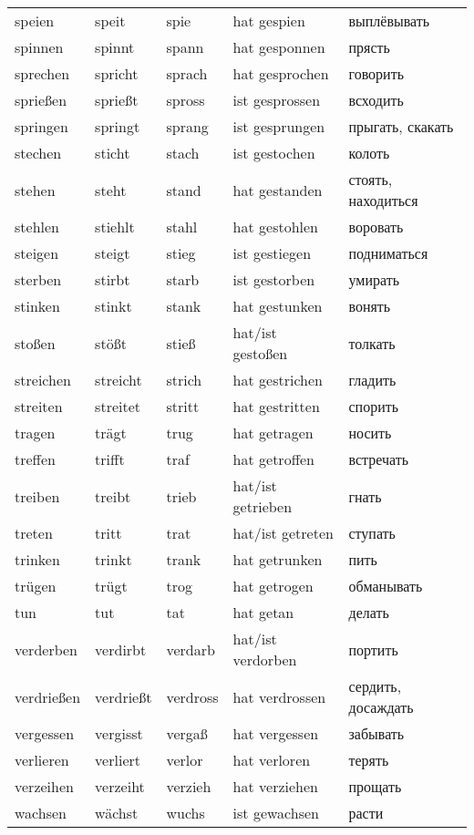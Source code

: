 \begin{longtable}{|l|l|l|l|l|}
speien & speit & spie & hat gespien & выплёвывать \\
spinnen & spinnt & spann & hat gesponnen & прясть \\
sprechen & spricht & sprach & hat gesprochen & говорить \\
sprie\ss en & sprie\ss t & spross & ist gesprossen & всходить \\
springen & springt & sprang & ist gesprungen & прыгать, скакать \\
stechen & sticht & stach & ist gestochen & колоть \\
stehen & steht & stand & hat gestanden & стоять, находиться \\
stehlen & stiehlt & stahl & hat gestohlen & воровать \\
steigen & steigt & stieg & ist gestiegen & подниматься \\
sterben & stirbt & starb & ist gestorben & умирать \\
stinken & stinkt & stank & hat gestunken & вонять \\
sto\ss en & st\"o\ss t & stie\ss  & hat/ist gesto\ss en & толкать \\
streichen & streicht & strich & hat gestrichen & гладить \\
streiten & streitet & stritt & hat gestritten & спорить \\
tragen & tr\"agt & trug & hat getragen & носить \\
treffen & trifft & traf & hat getroffen & встречать \\
treiben & treibt & trieb & hat/ist getrieben & гнать \\
treten & tritt & trat & hat/ist getreten & ступать \\
trinken & trinkt & trank & hat getrunken & пить \\
tr\"ugen & tr\"ugt & trog & hat getrogen & обманывать \\
tun & tut & tat & hat getan & делать \\
verderben & verdirbt & verdarb & hat/ist verdorben & портить \\
verdrie\ss en & verdrie\ss t & verdross & hat verdrossen & сердить, досаждать \\
vergessen & vergisst & verga\ss  & hat vergessen & забывать \\
verlieren & verliert & verlor & hat verloren & терять \\
verzeihen & verzeiht & verzieh & hat verziehen & прощать \\
wachsen & w\"achst & wuchs & ist gewachsen & расти \\

\end{longtable}
